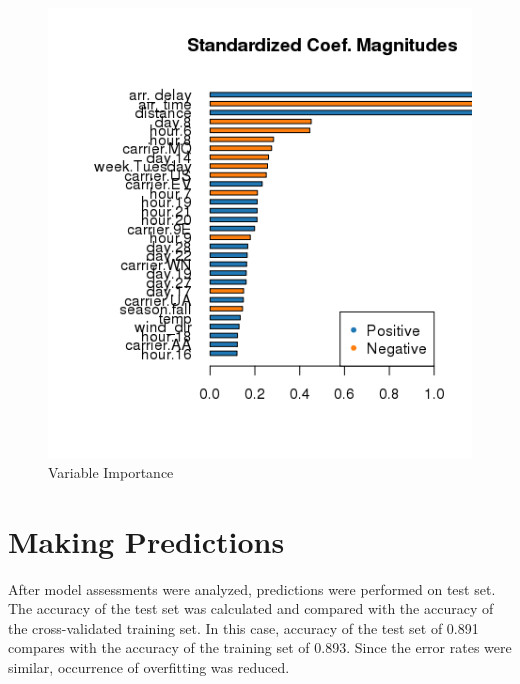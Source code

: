 \documentclass[12pt,twoside]{amherstthesis}
\begin{document}
  \begin{Shaded}
  \begin{Highlighting}[]
  \end{Highlighting}
  \end{Shaded}
  
  \begin{figure}[htbp]
  \centering
  \includegraphics[scale = 1,angle = 0]{figure/top30Weather.png}
  \caption[Variable Importance]{\normalsize{Variable Importance}}
  \label{fig:weath4}
  \end{figure}
  
  \clearpage
  
  \section{Making Predictions}\label{making-predictions-1}
  
  After model assessments were analyzed, predictions were performed on
  test set. The accuracy of the test set was calculated and compared with
  the accuracy of the cross-validated training set. In this case, accuracy
  of the test set of 0.891 compares with the accuracy of the training set
  of 0.893. Since the error rates were similar, occurrence of overfitting
  was reduced.
  
\end{document}
